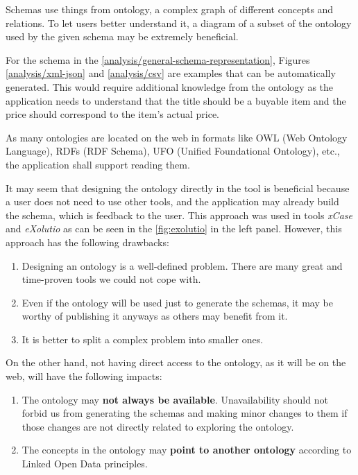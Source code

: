 Schemas use things from ontology, a complex graph of different concepts and relations. To let users better understand it, a diagram of a subset of the ontology used by the given schema may be extremely beneficial. %

For the schema in the \autoref{analysis/general-schema-representation}, Figures \ref{analysis/xml-json} and \ref{analysis/csv} are examples that can be automatically generated. This would require additional knowledge from the ontology as the application needs to understand that the title should be a buyable item and the price should correspond to the item's actual price. %

\begin{requirement}
    \label{requirement:ontologies-on-the-web}
    As many ontologies are located on the web in formats like OWL (Web Ontology Language), RDFs (RDF Schema), UFO (Unified Foundational Ontology), etc., the application shall support reading them.
\end{requirement}

It may seem that designing the ontology directly in the tool is beneficial because a user does not need to use other tools, and the application may already build the schema, which is feedback to the user. This approach was used in tools \textit{xCase} and \textit{eXolutio} as can be seen in the \autoref{fig:exolutio} in the left panel. However, this approach has the following drawbacks:

\begin{enumerate}
    \item Designing an ontology is a well-defined problem. There are many great and time-proven tools we could not cope with.
    \item Even if the ontology will be used just to generate the schemas, it may be worthy of publishing it anyways as others may benefit from it.
    \item It is better to split a complex problem into smaller ones.
\end{enumerate}

On the other hand, not having direct access to the ontology, as it will be on the web, will have the following impacts:

\begin{enumerate}
    \item The ontology may \textbf{not always be available}. Unavailability should not forbid us from generating the schemas and making minor changes to them if those changes are not directly related to exploring the ontology.
    \item The concepts in the ontology may \textbf{point to another ontology} according to Linked Open Data principles.
\end{enumerate}

